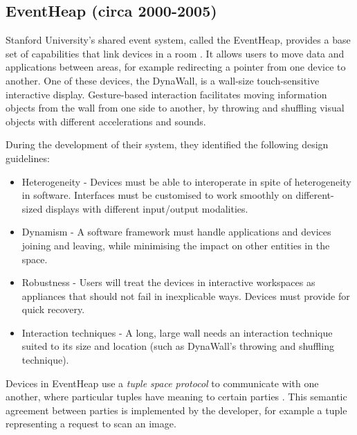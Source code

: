 \subsection{EventHeap (circa 2000-2005)}
\label{eventheap}
Stanford University's shared event system, called the EventHeap, provides a base set of capabilities that link devices in a room \cite{Winograd2005}. It allows users to move data and applications between areas, for example redirecting a pointer from one device to another. One of these devices, the DynaWall, is a wall-size touch-sensitive interactive display. Gesture-based interaction facilitates moving information objects from the wall from one side to another, by throwing and shuffling visual objects with different accelerations and sounds.

During the development of their system, they identified the following design guidelines:

\begin{itemize}
	\item Heterogeneity - Devices must be able to interoperate in spite of heterogeneity in software. Interfaces must be customised to work smoothly on different-sized displays with different input/output modalities.
	\item Dynamism - A software framework must handle applications and devices joining and leaving, while minimising the impact on other entities in the space.
	\item Robustness - Users will treat the devices in interactive workspaces as appliances that should not fail in inexplicable ways. Devices must provide for quick recovery.
	\item Interaction techniques - A long, large wall needs an interaction technique suited to its size and location (such as DynaWall's throwing and shuffling technique).
\end{itemize}

Devices in EventHeap use a \emph{tuple space protocol} to communicate with one another, where particular tuples have meaning to certain parties \cite{Edwards2001}. This semantic agreement between parties is implemented by the developer, for example a tuple representing a request to scan an image.

